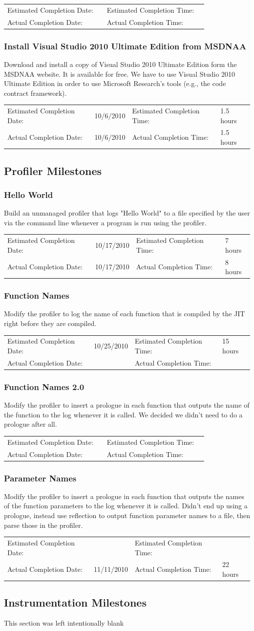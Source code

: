 \documentclass{article}
\newcommand{\timetbl}[4]{\par\vspace{5mm}\begin{tabular}{ l l l l }
Estimated Completion Date: & #1 & Estimated Completion Time: & #2 \\
Actual Completion Date: & #3 & Actual Completion Time: & #4 \\
\end{tabular}}
\begin{document}
\timetbl{}{}{}{}

\subsubsection{Install Visual Studio 2010 Ultimate Edition from MSDNAA}
Download and install a copy of Visual Studio 2010 Ultimate Edition form the MSDNAA website. It is available for free. We have to use Visual Studio 2010 Ultimate Edition in order to use Microsoft Research's tools (e.g., the code contract framework).

\timetbl{10/6/2010}{1.5 hours}{10/6/2010}{1.5 hours}

\subsection{Profiler Milestones}

\subsubsection{Hello World}
Build an unmanaged profiler that logs "Hello World" to a file specified by the user via the command line whenever a program is run using the profiler.

\timetbl{10/17/2010}{7 hours}{10/17/2010}{8 hours}

\subsubsection{Function Names}
Modify the profiler to log the name of each function that is compiled by the JIT right before they are compiled.

\timetbl{10/25/2010}{15 hours}{}{}

\subsubsection{Function Names 2.0}
Modify the profiler to insert a prologue in each function that outputs the name of the function to the log whenever it is called.
We decided we didn't need to do a prologue after all.
\timetbl{}{}{}{}

\subsubsection{Parameter Names}
Modify the profiler to insert a prologue in each function that outputs the names of the function parameters to the log whenever it is called.
Didn't end up using a prologue, instead use reflection to output function parameter names to a file, then parse those in the profiler.
\timetbl{}{}{11/11/2010}{22 hours}

\subsection{Instrumentation Milestones}

This section was left intentionally blank



\end{document}
